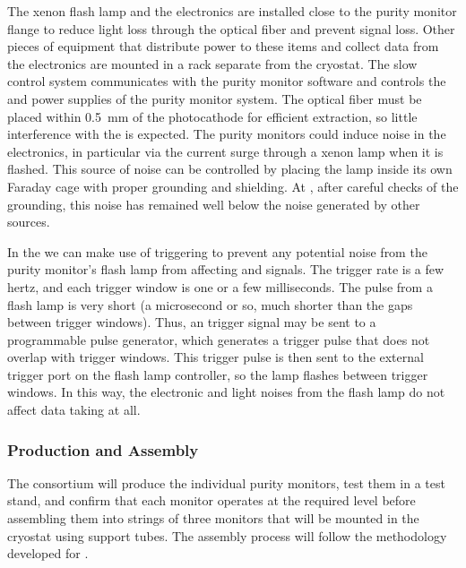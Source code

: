 The xenon flash lamp and the  electronics are installed close to the purity monitor flange to reduce light loss through the optical fiber and prevent signal loss. Other pieces of equipment that distribute power to these items and collect data from the electronics are mounted in a rack separate from the cryostat. The slow control system communicates with the purity monitor  software and controls  the  and  power supplies of the purity monitor system. The optical fiber must be placed within  \SI{0.5}{\milli\meter} of the photocathode for efficient \phel extraction, so little interference with the  is expected. The purity monitors could induce noise in the  electronics, in particular via the current surge through a xenon lamp when it is flashed.  This source of noise can be controlled by placing the lamp inside its own Faraday cage with %
proper grounding and shielding. %
At , after careful checks of the grounding, this noise has remained well below the noise generated by other sources.

In the  we can make use of triggering to prevent any potential noise from the purity monitor's flash lamp from affecting  and  signals. The  trigger rate is a few hertz, and each trigger window is one or a few milliseconds. %
The pulse from a flash lamp is very short (a microsecond or so, much shorter than the gaps between  trigger windows). 
Thus, an  trigger signal may be sent to a programmable pulse generator, %
which generates a trigger pulse that does not overlap with  trigger windows. This trigger pulse %
is then sent to the external trigger port on the flash lamp  controller, so the lamp flashes between  trigger windows. In this way, the electronic and light noises from the flash lamp do %
not affect %
data taking at all.


\subsubsection{Production and Assembly}
\label{sec:PrMon-Production-Assembly}

The  consortium will produce the individual purity monitors, test them in a test stand, and confirm that each monitor operates at the required level before assembling them into strings of three monitors that will be mounted in the  cryostat using support tubes. The assembly process will follow the methodology developed for .




